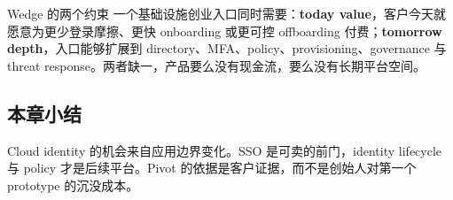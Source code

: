 \begin{importantbox}{Wedge 的两个约束}
一个基础设施创业入口同时需要：\textbf{today value}，客户今天就愿意为更少登录摩擦、更快 onboarding 或更可控 offboarding 付费；\textbf{tomorrow depth}，入口能够扩展到 directory、MFA、policy、provisioning、governance 与 threat response。两者缺一，产品要么没有现金流，要么没有长期平台空间。
\end{importantbox}

\subsection{本章小结}

Cloud identity 的机会来自应用边界变化。SSO 是可卖的前门，identity lifecycle 与 policy 才是后续平台。Pivot 的依据是客户证据，而不是创始人对第一个 prototype 的沉没成本。

